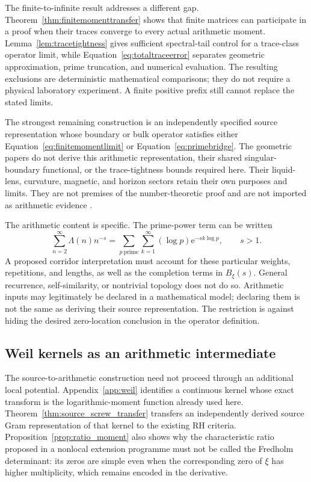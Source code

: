 \documentclass[11pt,letterpaper]{article}
\numberwithin{equation}{section}
\theoremstyle{definition}
\theoremstyle{remark}
\newcommand{\e}{\mathrm e}
\begin{document}
The finite-to-infinite result addresses a different gap. Theorem~\ref{thm:finitemomenttransfer} shows that finite matrices can participate in a proof when their traces converge to every actual arithmetic moment. Lemma~\ref{lem:tracetightness} gives sufficient spectral-tail control for a trace-class operator limit, while Equation~\eqref{eq:totaltraceerror} separates geometric approximation, prime truncation, and numerical evaluation. The resulting exclusions are deterministic mathematical comparisons; they do not require a physical laboratory experiment. A finite positive prefix still cannot replace the stated limits.

The strongest remaining construction is an independently specified source representation whose boundary or bulk operator satisfies either Equation~\eqref{eq:finitemomentlimit} or Equation~\eqref{eq:primebridge}. The geometric papers do not derive this arithmetic representation, their shared singular-boundary functional, or the trace-tightness bounds required here. Their liquid-lens, curvature, magnetic, and horizon sectors retain their own purposes and limits. They are not premises of the number-theoretic proof and are not imported as arithmetic evidence \cite{tcgsconservative,tcgsfoam}.

The arithmetic content is specific. The prime-power term can be written
\begin{equation}
 \sum_{n=2}^{\infty}\Lambda(n)n^{-s}
 =\sum_{p\ \mathrm{prime}}\sum_{k=1}^{\infty}
          (\log p)\e^{-sk\log p},\qquad s>1.
 \label{eq:primitiveprimedata}
\end{equation}
A proposed corridor interpretation must account for these particular weights, repetitions, and lengths, as well as the completion terms in $B_\xi(s)$. General recurrence, self-similarity, or nontrivial topology does not do so. Arithmetic inputs may legitimately be declared in a mathematical model; declaring them is not the same as deriving their source representation. The restriction is against hiding the desired zero-location conclusion in the operator definition.

\subsection{Weil kernels as an arithmetic intermediate}
\label{subsec:discussionweil}
The source-to-arithmetic construction need not proceed through an additional local potential. Appendix~\ref{app:weil} identifies a continuous kernel whose exact transform is the logarithmic-moment function already used here. Theorem~\ref{thm:source_screw_transfer} transfers an independently derived source Gram representation of that kernel to the existing RH criteria. Proposition~\ref{prop:ratio_moment} also shows why the characteristic ratio proposed in a nonlocal extension programme must not be called the Fredholm determinant: its zeros are simple even when the corresponding zero of $\xi$ has higher multiplicity, which remains encoded in the derivative.
\end{document}
